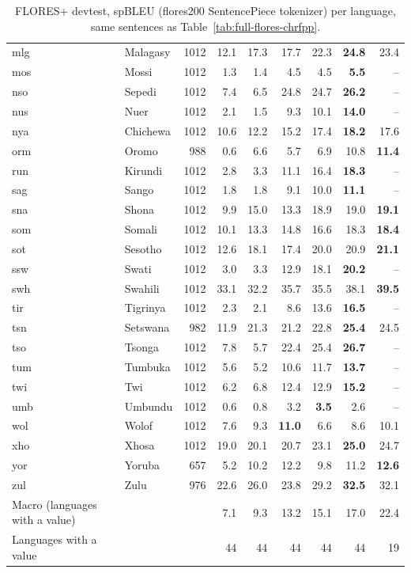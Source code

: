 \begin{table}[t]
\begin{tabular}{@{}llrrrrrrr@{}}
mlg & Malagasy & 1012 & 12.1 & 17.3 & 17.7 & 22.3 & \textbf{24.8} & 23.4 \\
mos & Mossi & 1012 & 1.3 & 1.4 & 4.5 & 4.5 & \textbf{5.5} & -- \\
nso & Sepedi & 1012 & 7.4 & 6.5 & 24.8 & 24.7 & \textbf{26.2} & -- \\
nus & Nuer & 1012 & 2.1 & 1.5 & 9.3 & 10.1 & \textbf{14.0} & -- \\
nya & Chichewa & 1012 & 10.6 & 12.2 & 15.2 & 17.4 & \textbf{18.2} & 17.6 \\
orm & Oromo & 988 & 0.6 & 6.6 & 5.7 & 6.9 & 10.8 & \textbf{11.4} \\
run & Kirundi & 1012 & 2.8 & 3.3 & 11.1 & 16.4 & \textbf{18.3} & -- \\
sag & Sango & 1012 & 1.8 & 1.8 & 9.1 & 10.0 & \textbf{11.1} & -- \\
sna & Shona & 1012 & 9.9 & 15.0 & 13.3 & 18.9 & 19.0 & \textbf{19.1} \\
som & Somali & 1012 & 10.1 & 13.3 & 14.8 & 16.6 & 18.3 & \textbf{18.4} \\
sot & Sesotho & 1012 & 12.6 & 18.1 & 17.4 & 20.0 & 20.9 & \textbf{21.1} \\
ssw & Swati & 1012 & 3.0 & 3.3 & 12.9 & 18.1 & \textbf{20.2} & -- \\
swh & Swahili & 1012 & 33.1 & 32.2 & 35.7 & 35.5 & 38.1 & \textbf{39.5} \\
tir & Tigrinya & 1012 & 2.3 & 2.1 & 8.6 & 13.6 & \textbf{16.5} & -- \\
tsn & Setswana & 982 & 11.9 & 21.3 & 21.2 & 22.8 & \textbf{25.4} & 24.5 \\
tso & Tsonga & 1012 & 7.8 & 5.7 & 22.4 & 25.4 & \textbf{26.7} & -- \\
tum & Tumbuka & 1012 & 5.6 & 5.2 & 10.6 & 11.7 & \textbf{13.7} & -- \\
twi & Twi & 1012 & 6.2 & 6.8 & 12.4 & 12.9 & \textbf{15.2} & -- \\
umb & Umbundu & 1012 & 0.6 & 0.8 & 3.2 & \textbf{3.5} & 2.6 & -- \\
wol & Wolof & 1012 & 7.6 & 9.3 & \textbf{11.0} & 6.6 & 8.6 & 10.1 \\
xho & Xhosa & 1012 & 19.0 & 20.1 & 20.7 & 23.1 & \textbf{25.0} & 24.7 \\
yor & Yoruba & 657 & 5.2 & 10.2 & 12.2 & 9.8 & 11.2 & \textbf{12.6} \\
zul & Zulu & 976 & 22.6 & 26.0 & 23.8 & 29.2 & \textbf{32.5} & 32.1 \\
\midrule
Macro (languages with a value) & & & 7.1 & 9.3 & 13.2 & 15.1 & 17.0 & 22.4 \\
Languages with a value & & & 44 & 44 & 44 & 44 & 44 & 19 \\
\bottomrule
\end{tabular}
\caption{FLORES+ devtest, spBLEU (flores200 SentencePiece tokenizer) per language, same sentences as Table~\ref{tab:full-flores-chrfpp}.}
\label{tab:full-flores-spbleu}
\end{table}
